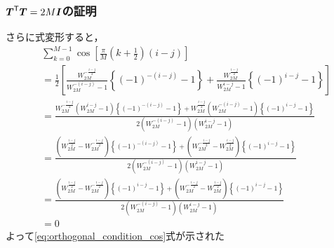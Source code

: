 \documentclass[14pt,xcolor=dvipsnames,table,dvipdfmx]{beamer}
\begin{document}
\begin{frame}[c]
    \frametitle{$\boldsymbol{T}^{\mathsf{T}} \boldsymbol{T} = 2M\boldsymbol{I}$の証明}
    さらに式変形すると，
    \scriptsize
    \begin{align*}
        & \sum_{k = 0}^{M - 1} \cos\left[ \frac{\pi}{M} \left( k + \frac{1}{2} \right) ( i - j ) \right] \\
        &= \frac{1}{2} \left[ \frac{W_{2M}^{-\frac{i - j}{2}}}{W_{2M}^{-(i - j)} - 1} \left\{ (-1)^{-(i - j)} - 1 \right\} + \frac{W_{2M}^{\frac{i - j}{2}}}{W_{2M}^{i - j} - 1} \left\{ (-1)^{i - j} - 1 \right\} \right] \\
        &= \frac{W_{2M}^{-\frac{i - j}{2}} (W_{2M}^{i - j} - 1)\left\{ (-1)^{-(i - j)} - 1 \right\} + W_{2M}^{\frac{i - j}{2}} (W_{2M}^{-(i - j)} - 1)\left\{ (-1)^{i - j} - 1 \right\}}{2(W_{2M}^{-(i - j)} - 1)(W_{2M}^{i - j} - 1)} \\
        &= \frac{(W_{2M}^{\frac{i - j}{2}} - W_{2M}^{-\frac{i - j}{2}})\left\{ (-1)^{-(i - j)} - 1 \right\} + (W_{2M}^{-\frac{i - j}{2}} - W_{2M}^{\frac{i - j}{2}})\left\{ (-1)^{i - j} - 1 \right\}}{2(W_{2M}^{-(i - j)} - 1)(W_{2M}^{i - j} - 1)} \\
        &= \frac{(W_{2M}^{\frac{i - j}{2}} - W_{2M}^{-\frac{i - j}{2}})\left\{ (-1)^{i - j} - 1 \right\} + (W_{2M}^{-\frac{i - j}{2}} - W_{2M}^{\frac{i - j}{2}})\left\{ (-1)^{i - j} - 1 \right\}}{2(W_{2M}^{-(i - j)} - 1)(W_{2M}^{i - j} - 1)} \\
        &= 0
    \end{align*}
    \normalsize
    よって\eqref{eq:orthogonal_condition_cos}式が示された
\end{frame}
\end{document}
